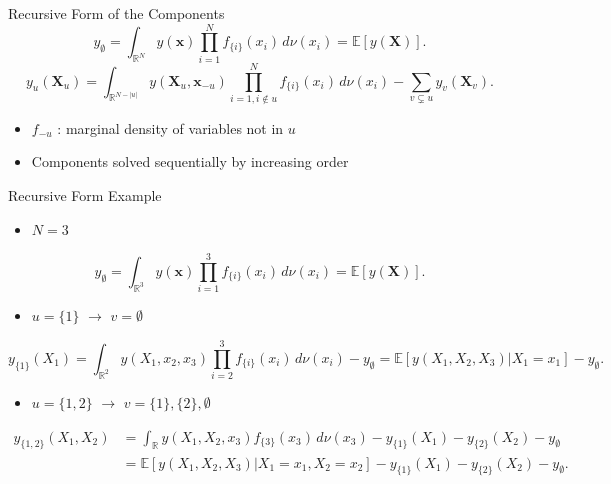 \begin{frame}{Recursive Form of the Components} %
    \[
    y_{\emptyset} = \int_{\mathbb{R}^N} y(\boldsymbol{x}) \prod_{i=1}^{N} f_{\{i\}}(x_i) \, d\nu (x_i) = \mathbb{E}[y(\boldsymbol{X})].
    \]
\begin{equation}
    y_u(\boldsymbol{X}_u) 
    = \int_{\mathbb{R}^{N- |u|}} 
        y(\boldsymbol{X}_u, \boldsymbol{x}_{-u}) 
        \prod_{i=1, i \notin u}^{N} f_{\{i\}}(x_i) 
        \, d\nu (x_i) 
      - \sum_{v \subsetneq u} y_v(\boldsymbol{X}_v).
    \label{eq:fanova_components_classical}
\end{equation}
  \begin{itemize}
    \item $f_{-u}$ : marginal density of variables not in $u$
    \item Components solved sequentially by increasing order
  \end{itemize}
\end{frame}

\begin{frame}{Recursive Form Example}
  \begin{itemize}
    \item $N = 3$
  \end{itemize}
    \[
    y_{\emptyset} = \int_{\mathbb{R}^3} y(\boldsymbol{x}) \prod_{i=1}^{3} f_{\{i\}}(x_i) \, d\nu (x_i) = \mathbb{E}[y(\boldsymbol{X})].
    \]
  \begin{itemize}
    \item $u = \{1\}$ $\rightarrow$ $v = \emptyset$
  \end{itemize}
    \begin{equation*}
    y_{\{1\}}(X_1) 
    = \int_{\mathbb{R}^{2}} 
        y(X_{1}, x_{2}, x_{3}) 
        \prod_{i=2}^{3} f_{\{i\}}(x_i) 
        \, d\nu (x_i) 
      -  y_{\emptyset} = \mathbb{E}[y(X_1, X_2, X_3)|X_1 = x_1] - y_{\emptyset}.
\end{equation*}
  \begin{itemize}
    \item $u = \{1,2\}$ $\rightarrow$ $v = \{1\}, \{2\}, \emptyset$
  \end{itemize}
    \begin{align*}
    y_{\{1,2\}}(X_1, X_2) 
    &= \int_{\mathbb{R}} 
        y(X_1, X_2, x_3) 
        f_{\{3\}}(x_3) 
        \, d\nu (x_3) 
      -  y_{\{1\}}(X_1) -  y_{\{2\}}(X_2) - y_{\emptyset} \\
    &= \mathbb{E}[y(X_1, X_2, X_3)|X_1 = x_1, X_2 = x_2] - y_{\{1\}}(X_1) - y_{\{2\}}(X_2) - y_{\emptyset}.
\end{align*}
  
\end{frame}


